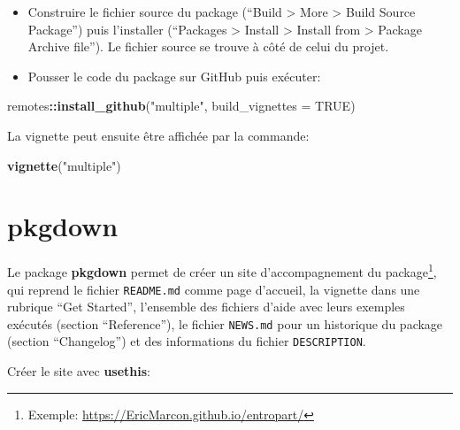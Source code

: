 \documentclass[
  12pt,
  french,
  a4paper,
  extrafontsizes,onecolumn,openright
  ]{memoir}
\newenvironment{Shaded}{\begin{snugshade}}{\end{snugshade}}
\newcommand{\AttributeTok}[1]{\textcolor[rgb]{0.13,0.29,0.53}{#1}}
\newcommand{\ConstantTok}[1]{\textcolor[rgb]{0.56,0.35,0.01}{#1}}
\newcommand{\FunctionTok}[1]{\textcolor[rgb]{0.13,0.29,0.53}{\textbf{#1}}}
\newcommand{\NormalTok}[1]{#1}
\newcommand{\SpecialCharTok}[1]{\textcolor[rgb]{0.81,0.36,0.00}{\textbf{#1}}}
\newcommand{\StringTok}[1]{\textcolor[rgb]{0.31,0.60,0.02}{#1}}
\providecommand{\tightlist}{%
  \setlength{\itemsep}{0pt}\setlength{\parskip}{0pt}}
\begin{document}
\begin{itemize}
\tightlist
\item
  Construire le fichier source du package (\enquote{Build \textgreater{} More \textgreater{} Build Source Package}) puis l'installer (\enquote{Packages \textgreater{} Install \textgreater{} Install from \textgreater{} Package Archive file}).
  Le fichier source se trouve à côté de celui du projet.
\item
  Pousser le code du package sur GitHub puis exécuter:
\end{itemize}

\scriptsize

\begin{Shaded}
\begin{Highlighting}[]
\NormalTok{remotes}\SpecialCharTok{::}\FunctionTok{install\_github}\NormalTok{(}\StringTok{"multiple"}\NormalTok{, }\AttributeTok{build\_vignettes =} \ConstantTok{TRUE}\NormalTok{)}
\end{Highlighting}
\end{Shaded}

\normalsize

La vignette peut ensuite être affichée par la commande:

\scriptsize

\begin{Shaded}
\begin{Highlighting}[]
\FunctionTok{vignette}\NormalTok{(}\StringTok{"multiple"}\NormalTok{)}
\end{Highlighting}
\end{Shaded}

\normalsize

\section{pkgdown}\label{pkgdown}

Le package \textbf{pkgdown} permet de créer un site d'accompagnement du package\footnote{Exemple: \url{https://EricMarcon.github.io/entropart/}}, qui reprend le fichier \texttt{README.md} comme page d'accueil, la vignette dans une rubrique \enquote{Get Started}, l'ensemble des fichiers d'aide avec leurs exemples exécutés (section \enquote{Reference}), le fichier \texttt{NEWS.md} pour un historique du package (section \enquote{Changelog}) et des informations du fichier \texttt{DESCRIPTION}.

Créer le site avec \textbf{usethis}:

\scriptsize
\end{document}
